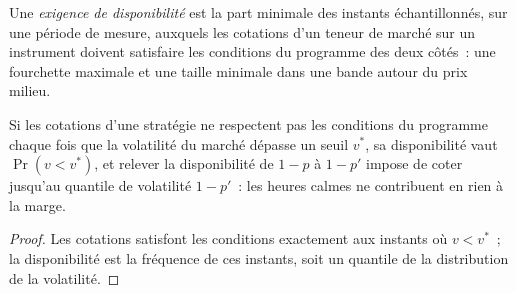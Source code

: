 \begin{definition}\label{def:m3:getting-access-crypto-venues:uptime}
Une \emph{exigence de disponibilité} est la part minimale des instants échantillonnés, sur une période de mesure, auxquels les cotations
d'un teneur de marché sur un instrument doivent satisfaire les conditions du programme des deux côtés~: une fourchette maximale et une taille minimale dans une bande autour du prix milieu.
\end{definition}

\begin{proposition}\label{prop:m3:getting-access-crypto-venues:tails}
Si les cotations d'une stratégie ne respectent pas les conditions du programme chaque fois que la volatilité du marché dépasse un seuil $v^*$, sa disponibilité vaut
$\Pr(v < v^*)$, et relever la disponibilité de $1 - p$ à $1 - p'$ impose de coter jusqu'au quantile de volatilité $1 - p'$~: les heures calmes
ne contribuent en rien à la marge.
\end{proposition}

\begin{proof}
Les cotations satisfont les conditions exactement aux instants où $v < v^*$~; la disponibilité est la fréquence de ces instants, soit un quantile de la distribution de la volatilité.
\end{proof}

